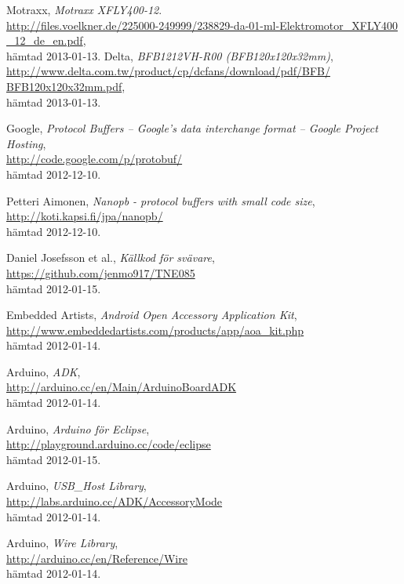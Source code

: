 \begin{thebibliography}{9}
Motraxx,
\emph{Motraxx XFLY400-12}. \\
\url{http://files.voelkner.de/225000-249999/238829-da-01-ml-Elektromotor_XFLY400
_12_de_en.pdf},
\\ hämtad 2013-01-13.
Delta,
\emph{BFB1212VH-R00 (BFB120x120x32mm)},\\
\url{http://www.delta.com.tw/product/cp/dcfans/download/pdf/BFB/
BFB120x120x32mm.pdf},
\\ hämtad 2013-01-13.

Google,
\emph{Protocol Buffers – Google's data interchange format – Google Project
Hosting}, \\
\url{http://code.google.com/p/protobuf/} \\
hämtad 2012-12-10.

Petteri Aimonen,
\emph{Nanopb - protocol buffers with small code size}, \\
\url{http://koti.kapsi.fi/jpa/nanopb/} \\
hämtad 2012-12-10.

Daniel Josefsson et al.,
\emph{Källkod för svävare}, \\
\url{https://github.com/jenmo917/TNE085} \\
hämtad 2012-01-15.

Embedded Artists,
\emph{Android Open Accessory Application Kit}, \\
\url{http://www.embeddedartists.com/products/app/aoa_kit.php} \\
hämtad 2012-01-14.

Arduino,
\emph{ADK}, \\
\url{http://arduino.cc/en/Main/ArduinoBoardADK} \\
hämtad 2012-01-14.

Arduino,
\emph{Arduino för Eclipse}, \\
\url{http://playground.arduino.cc/code/eclipse} \\
hämtad 2012-01-15.

Arduino,
\emph{USB_Host Library}, \\
\url{http://labs.arduino.cc/ADK/AccessoryMode} \\
hämtad 2012-01-14.

Arduino,
\emph{Wire Library}, \\
\url{http://arduino.cc/en/Reference/Wire} \\
hämtad 2012-01-14.


\end{thebibliography}

